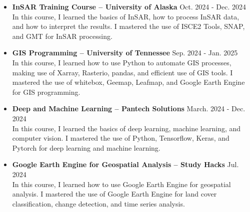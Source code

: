 \documentclass[a4paper,10pt]{article}
\begin{document}
\begin{itemize}[leftmargin=*]
    \item \textbf{InSAR Training Course – University of Alaska } \hfill Oct. 2024 {-} Dec. 2024\\
    In this course, I learned the basics of InSAR, how to process InSAR data, and how to interpret the results. I mastered the use of ISCE2 Tools, SNAP, and GMT for InSAR processing.

    \item \textbf{GIS Programming – University of Tennessee} \hfill Sep. 2024 {-} Jan. 2025\\
    In this course, I learned how to use Python to automate GIS processes, making use of Xarray, Rasterio, pandas, and efficient use of GIS tools. I mastered the use of whitebox, Geemap, Leafmap, and Google Earth Engine for GIS programming.


    \item \textbf{Deep and Machine Learning  – Pantech Solutions} \hfill March. 2024  {-} Dec. 2024\\
    In this course, I learned the basics of deep learning, machine learning, and computer vision. I mastered the use of Python, Tensorflow, Keras, and Pytorch for deep learning and machine learning.
    \item \textbf{Google Earth Engine for Geospatial Analysis – Study Hacks} \hfill Jul. 2024 \\
    In this course, I learned how to use Google Earth Engine for geospatial analysis. I mastered the use of Google Earth Engine for land cover classification, change detection, and time series analysis.
    
\end{itemize}
\end{document}
